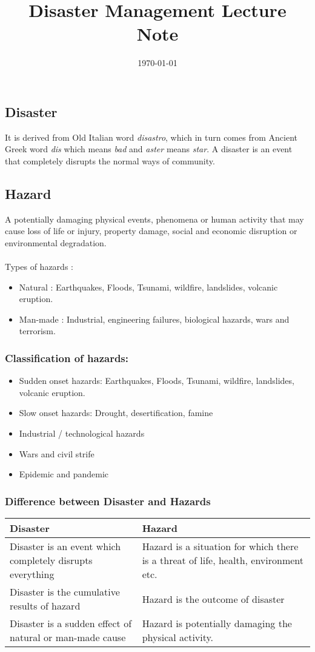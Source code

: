 \documentclass[12pt,a4paper]{article}
\title{Disaster Management Lecture Note \vspace{-2em}}
\date{\today}
\begin{document}
  \maketitle
  
\subsection*{Disaster}
It is derived from Old Italian word \textit{disastro}, which in turn comes from Ancient Greek word \textit{dis} which means \textit{bad} and \textit{aster} means \textit{star}. A disaster is an event that completely disrupts the normal ways of community.

\subsection*{Hazard}  
A potentially damaging physical events, phenomena or human activity that may cause loss of life or injury, property damage, social and economic disruption or environmental degradation. 
\\
\\
Types of hazards :
\begin{itemize}
	\item Natural : Earthquakes, Floods, Tsunami, wildfire, landslides, volcanic eruption.
	\item Man-made : Industrial, engineering failures, biological hazards, wars and terrorism.
\end{itemize}
\subsubsection*{Classification of hazards:} 
\begin{itemize}
	\item Sudden onset hazards: Earthquakes, Floods, Tsunami, wildfire, landslides, volcanic eruption.
	\item Slow onset hazards: Drought, desertification, famine 
	\item Industrial / technological hazards 
	\item Wars and civil strife
	\item Epidemic and pandemic
\end{itemize}

\subsubsection*{Difference between Disaster and Hazards}
\begin{center}
	\begin{tabular}{ p{60mm}|p{60mm} }
		\textbf{Disaster} &  \textbf{Hazard} \\
		\hline
		Disaster is an event which completely disrupts everything & 
		Hazard is a situation for which there is a threat of life, health, environment etc. \\ 
		Disaster is the cumulative results of hazard & Hazard is the outcome of disaster \\  
		Disaster is a sudden effect of natural or man-made cause & Hazard is potentially damaging the physical activity.   
	\end{tabular}
\end{center}
\end{document}
